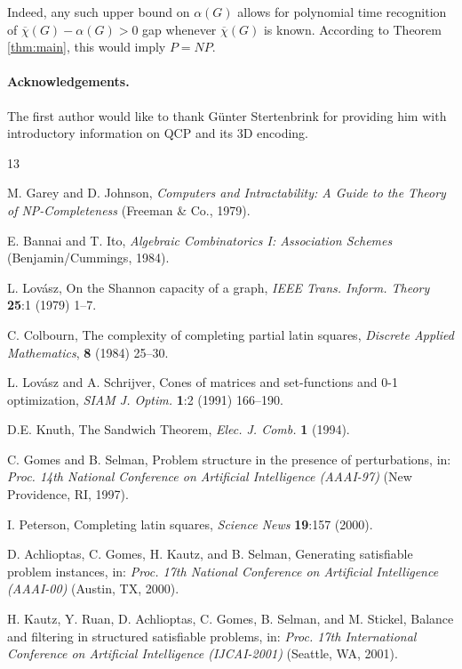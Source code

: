 \documentclass[11pt]{article}
\begin{document}
Indeed, any such upper bound on $\alpha(G)$ allows for polynomial time 
recognition of $\overline{\chi}(G)-\alpha(G)>0$ gap whenever 
$\overline{\chi}(G)$ is known. According to Theorem \ref{thm:main}, this would 
imply $P=NP$.

\paragraph{Acknowledgements.}
The first author would like to thank G\"unter Stertenbrink for providing him 
with introductory information on QCP and its 3D encoding.

\begin{thebibliography}{13}

  M. Garey and D. Johnson,
  {\em Computers and Intractability: A Guide to the Theory of NP-Completeness\/}
  (Freeman \& Co., 1979).

  E. Bannai and T. Ito,
  {\em Algebraic Combinatorics I: Association Schemes\/}
  (Benjamin/Cummings, 1984).
  
  L. Lov\'asz, On the Shannon capacity of a graph,
  {\em IEEE Trans. Inform. Theory\/} {\bf 25}:1 (1979) 1--7.

  C. Colbourn,
  The complexity of completing partial latin squares,
  {\em Discrete Applied Mathematics\/}, {\bf 8} (1984) 25--30.

  L. Lov\'asz and A. Schrijver,
  Cones of matrices and set-functions and 0-1 optimization,
  {\em SIAM J. Optim.\/} {\bf 1}:2 (1991) 166--190.

  D.E. Knuth, The Sandwich Theorem,
  {\em Elec. J. Comb.} {\bf 1} (1994).

  C. Gomes and B. Selman,
  Problem structure in the presence of perturbations,
  in: {\em Proc. 14th National Conference on Artificial Intelligence
  (AAAI-97)\/} (New Providence, RI, 1997).

  I. Peterson,
  Completing latin squares,
  {\em Science News\/} {\bf 19}:157 (2000).

  D. Achlioptas, C. Gomes, H. Kautz, and B. Selman,
  Generating satisfiable problem instances,
  in: {\em Proc. 17th National Conference on Artificial Intelligence
  (AAAI-00)\/} (Austin, TX, 2000).

  H. Kautz, Y. Ruan, D. Achlioptas, C. Gomes, B. Selman, and M. Stickel,
  Balance and filtering in structured satisfiable problems,
  in: {\em Proc. 17th International Conference on Artificial Intelligence
  (IJCAI-2001)\/} (Seattle, WA, 2001).


\end{thebibliography}
\end{document}
